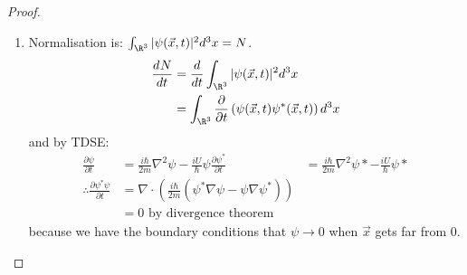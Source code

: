 \documentclass[../Main.tex]{subfiles}
\begin{document}
\begin{proof}
    \begin{enumerate}
        \item Normalisation is: $\int_{\R^3} |\psi(\vec{x}, t)|^2 d^3x = N$.
            \begin{align*}
                \frac{d^{}N}{dt^{}} &= \frac{d}{dt} \int_{\R^3} |\psi(\vec{x}, t)|^2 d^3x \\
                &= \int_{\R^3} \frac{\partial}{\partial t} \left(\psi(\vec{x}, t) \psi^*(\vec{x}, t)\right) d^3x
            \end{align*}
            and by TDSE:
            \begin{align*}
                \frac{\partial \psi}{\partial t} &= \frac{i \hbar}{2m} \nabla^2 \psi - \frac{iU}{\hbar}\psi                
                \frac{\partial \psi^*}{\partial t} &= \frac{i \hbar}{2m} \nabla^2 \psi* - \frac{iU}{\hbar}\psi* \\
                \therefore \frac{\partial \psi^* \psi}{\partial t} &= \nabla \cdot \left(\frac{i\hbar}{2m} \left(\psi^* \nabla \psi - \psi \nabla \psi^*\right)\right) \\
                &=0 \text{ by divergence theorem}
            \end{align*}
            because we have the boundary conditions that $\psi \to 0$ when $\vec{x}$ gets far from $0$.
    \end{enumerate}
\end{proof}
\end{document}
